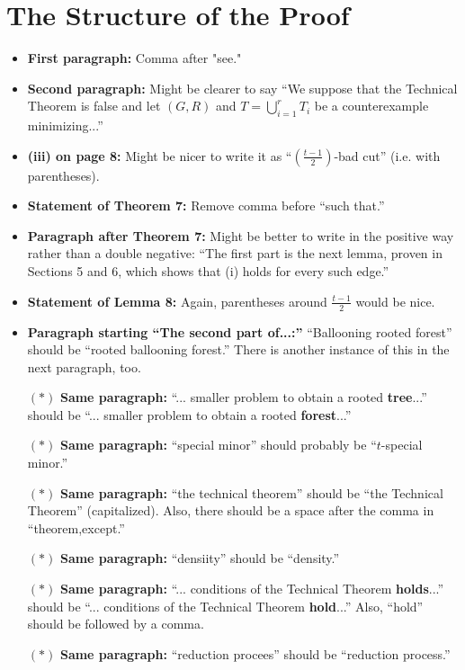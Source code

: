 \documentclass[11 pt]{article}
\begin{document}
\section{The Structure of the Proof}

\begin{itemize}
\item\textbf{First paragraph:} Comma after "see."
\item \textbf{Second paragraph:} Might be clearer to say ``We suppose that the Technical Theorem is false and let $(G,R)$ and $T=\bigcup_{i=1}^rT_i$ be a counterexample minimizing...''
\item \textbf{(iii) on page 8:} Might be nicer to write it as ``$\left(\frac{t-1}{2}\right)$-bad cut'' (i.e. with parentheses). 
\item \textbf{Statement of Theorem 7:} Remove comma before ``such that.''
\item \textbf{Paragraph after Theorem 7:} Might be better to write in the positive way rather than a double negative: ``The first part is the next lemma, proven in Sections 5 and 6, which shows that (i) holds for every such edge.''
\item \textbf{Statement of Lemma 8:} Again, parentheses around $\frac{t-1}{2}$ would be nice. 
\item \textbf{Paragraph starting ``The second part of...:''} ``Ballooning rooted forest'' should be ``rooted ballooning forest.'' There is another instance of this in the next paragraph, too.
\item[$\boldsymbol{(*)}$] \textbf{Same paragraph:} ``... smaller problem to obtain a rooted \textbf{tree}...'' should be  ``... smaller problem to obtain a rooted \textbf{forest}...''
\item[$\boldsymbol{(*)}$] \textbf{Same paragraph:} ``special minor'' should probably be ``$t$-special minor.''
\item[$\boldsymbol{(*)}$] \textbf{Same paragraph:} ``the technical theorem'' should be  ``the Technical Theorem'' (capitalized). Also, there should be a space after the comma in ``theorem,except.''
\item[$\boldsymbol{(*)}$] \textbf{Same paragraph:} ``densiity'' should be ``density.''
\item[$\boldsymbol{(*)}$] \textbf{Same paragraph:} ``... conditions of the Technical Theorem \textbf{holds}...'' should be ``... conditions of the Technical Theorem \textbf{hold}...'' Also, ``hold'' should be followed by a comma.
\item[$\boldsymbol{(*)}$] \textbf{Same paragraph:} ``reduction procees'' should be ``reduction process.''

\end{itemize}
\end{document}
